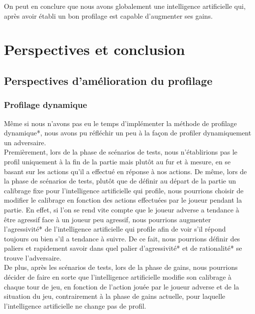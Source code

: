 \documentclass{report}
\begin{document}
On peut en conclure que nous avons globalement une intelligence artificielle qui, après avoir établi un bon profilage est capable d'augmenter ses gains.
 
\chapter{Perspectives et conclusion}
\section{Perspectives d'amélioration du profilage}
\subsection{Profilage dynamique}

\hspace{0.5cm}Même si nous n'avons pas eu le temps d'implémenter la méthode de profilage dynamique*, nous avons pu réfléchir un peu à la façon de profiler dynamiquement un adversaire.\\

Premièrement, lors de la phase de scénarios de tests, nous n'établirions pas le profil uniquement à la fin de la partie mais plutôt au fur et à mesure, en se basant sur les actions qu'il a effectué en réponse à nos actions. De même, lors de la phase de scénarios de tests, plutôt que de définir au départ de la partie un calibrage fixe pour l'intelligence artificielle qui profile, nous pourrions choisir de modifier le calibrage en fonction des actions effectuées par le joueur pendant la partie. En effet, si l'on se rend vite compte que le joueur adverse a tendance à être agressif face à un joueur peu agressif, nous pourrions augmenter l'agressivité* de l'intelligence artificielle qui profile afin de voir s'il répond toujours ou bien s'il a tendance à suivre. De ce fait, nous pourrions définir des paliers et rapidement savoir dans quel palier d'agressivité* et de rationalité* se trouve l'adversaire.\\

De plus, après les scénarios de tests, lors de la phase de gains, nous pourrions décider de faire en sorte que l'intelligence artificielle modifie son calibrage à chaque tour de jeu, en fonction de l'action jouée par le joueur adverse et de la situation du jeu, contrairement à la phase de gains actuelle, pour laquelle l'intelligence artificielle ne change pas de profil.\par
\end{document}
